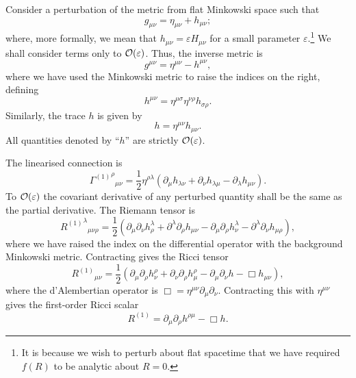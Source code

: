 Consider a perturbation of the metric from flat Minkowski space such that
\begin{equation}
g_{\mu\nu} = \eta_{\mu\nu} + h_{\mu\nu};
\end{equation}
where, more formally, we mean that $h_{\mu\nu} = \varepsilon H_{\mu\nu}$ for a small parameter $\varepsilon$.\footnote{It is because we wish to perturb about flat spacetime that we have required $f(R)$ to be analytic about $R = 0$.} We shall consider terms only to $\mathcal{O}({\varepsilon})$. Thus, the inverse metric is
\begin{equation}
g^{\mu\nu} = \eta^{\mu\nu} - h^{\mu\nu},
\end{equation}
where we have used the Minkowski metric to raise the indices on the right, defining
\begin{equation}
h^{\mu\nu} = \eta^{\mu\sigma}\eta^{\nu\rho}h_{\sigma\rho}.
\end{equation}
Similarly, the trace $h$ is given by
\begin{equation}
h = \eta^{\mu\nu}h_{\mu\nu}.
\end{equation}
All quantities denoted by ``$h$'' are strictly $\mathcal{O}({\varepsilon})$.

The linearised connection is
\begin{equation}
{{\Gamma^{(1)}}^\rho}_{\mu\nu} = \frac{1}{2}\eta^{\rho\lambda}(\partial_\mu h_{\lambda\nu} + \partial_\nu h_{\lambda\mu} - \partial_\lambda h_{\mu\nu}).
\label{eq:Lin_Gamma}
\end{equation}
To $\mathcal{O}({\varepsilon})$ the covariant derivative of any perturbed quantity shall be the same as the partial derivative. The Riemann tensor is
\begin{equation}
{{R^{(1)}}^\lambda}_{\mu\nu\rho} = \frac{1}{2}(\partial_\mu\partial_\nu h^\lambda_\rho + \partial^\lambda\partial_\rho h_{\mu\nu} - \partial_\mu\partial_\rho h^\lambda_\nu - \partial^\lambda\partial_\nu h_{\mu\rho}),
\label{eq:Lin_Riemann}
\end{equation}
where we have raised the index on the differential operator with the background Minkowski metric. Contracting gives the Ricci tensor
\begin{equation}
{R^{(1)}}_{\mu\nu} = \frac{1}{2}(\partial_\mu\partial_\rho h^\rho_\nu + \partial_\nu\partial_\rho h^\rho_\mu - \partial_\mu\partial_\nu h - \Box h_{\mu\nu}),
\label{eq:Ricci}
\end{equation}
where the d'Alembertian operator is $\Box = \eta^{\mu\nu}\partial_\mu\partial_\nu$. Contracting this with $\eta^{\mu\nu}$ gives the first-order Ricci scalar
\begin{equation}
R^{(1)} = \partial_\mu\partial_\rho h^{\rho\mu} - \Box h.
\label{eq:Scalar}
\end{equation}

